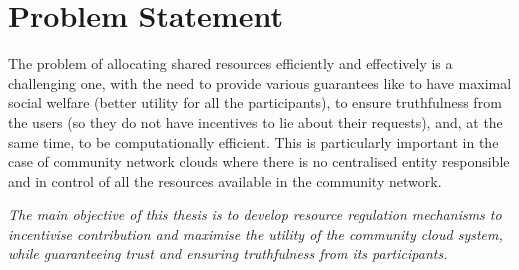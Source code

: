 
\section{Problem Statement}
\label{sec__problem_statement}

The problem of allocating shared resources efficiently and effectively is a challenging one,
with the need to provide various guarantees like
	to have maximal social welfare (better utility for all the participants),
	to ensure truthfulness from the users (so they do not have incentives to lie about their requests),
	and, at the same time, to be computationally efficient.
This is particularly important in the case of community network clouds where there is no centralised entity
responsible and in control of all the resources available in the community network.

\emph{
The main objective of this thesis is to develop resource regulation mechanisms 
	to incentivise contribution 
	and maximise the utility of the community cloud system,
	while guaranteeing trust and ensuring truthfulness from its participants.
}

